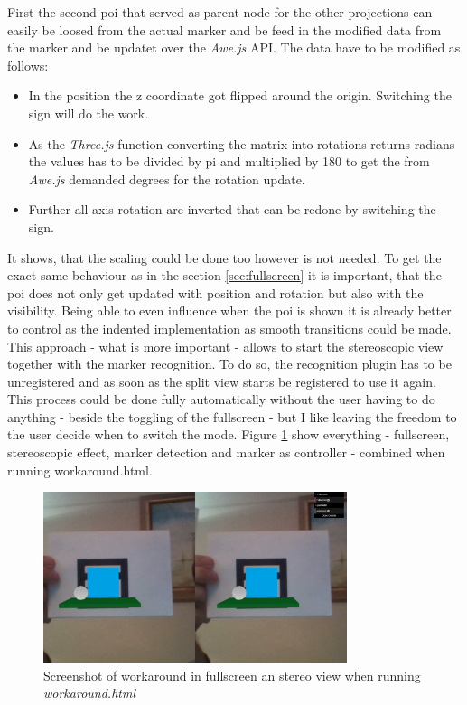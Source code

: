 First the second poi that served as parent node for the other projections can easily be loosed from the actual marker and be feed in the modified data from the marker and be updatet over the \textit{Awe.js} API. The data have to be modified as follows:
\begin{itemize}
\item In the position the z coordinate got flipped around the origin. Switching the sign will do the work.
\item As the \textit{Three.js} function converting the matrix into rotations returns radians the values has to be divided by pi and multiplied by 180 to get the from \textit{Awe.js}  demanded degrees for the rotation update.
\item Further all axis rotation are inverted that can be redone by switching the sign.
\end{itemize}
It shows, that the scaling could be done too however is not needed. 
To get the exact same behaviour as in the section \ref{sec:fullscreen} it is important, that the poi does not only get updated with position and rotation but also with the visibility. Being able to even influence when the poi is shown it is already better to control as the indented implementation as smooth transitions could be made. This approach - what is more important - allows to start the stereoscopic view together with the marker recognition. To do so, the recognition plugin has to be unregistered and as soon as the split view starts be registered to use it again. This process could be done fully automatically without the user having to do anything - beside the toggling of the fullscreen - but I like leaving the freedom to the user decide when to switch the mode. Figure \ref{fig:workaround} show everything - fullscreen, stereoscopic effect, marker detection and marker as controller - combined when running workaround.html.  

\begin{figure}[h]
    \centering
    \includegraphics[height=5cm]{Document/Figures/chapter4/ScreenshotWorkaroundFullStereo.jpg}
    \caption[Screenshot workaround]{Screenshot of workaround in fullscreen an stereo view when  running \mbox{\textit{workaround.html}}}
    \label{fig:workaround}
\end{figure}



